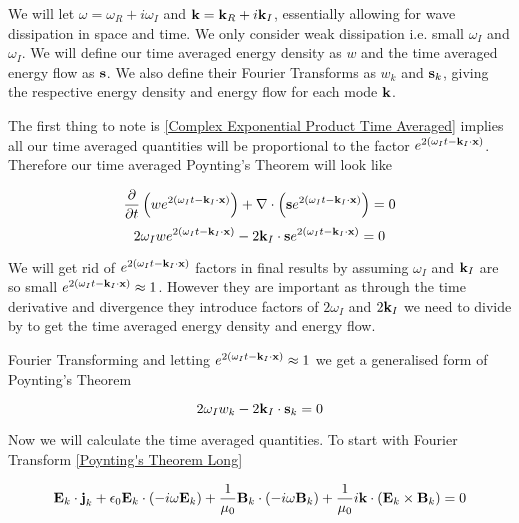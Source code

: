 We will let $\omega = \omega_R + i \omega_I$ and $\textbf{k} = \textbf{k}_R + i \textbf{k}_I$, essentially allowing for wave dissipation in space and time. We only consider weak dissipation i.e. small $\omega_I$ and $\omega_I$. We will define our time averaged energy density as $w$ and the time averaged energy flow as $\textbf{s}$. We also define their Fourier Transforms as $w_k$ and $\textbf{s}_k$, giving the respective energy density and energy flow for each mode $\textbf{k}$.

The first thing to note is \eqref{Complex Exponential Product Time Averaged} implies all our time averaged quantities will be proportional to the factor $e^{2 \left( \omega_I t - \textbf{k}_I \cdot \textbf{x} \right)}$. Therefore our time averaged Poynting's Theorem will look like

\begin{equation*}
	\frac{\partial}{\partial t} \left( w e^{2 \left( \omega_I t - \textbf{k}_I \cdot \textbf{x} \right)} \right) + \nabla \cdot \left( \textbf{s} e^{2 \left( \omega_I t - \textbf{k}_I \cdot \textbf{x} \right)} \right) = 0
\end{equation*}
\begin{equation}
	2 \omega_I w e^{2 \left( \omega_I t - \textbf{k}_I \cdot \textbf{x} \right)} - 2 \textbf{k}_I \cdot \textbf{s} e^{2 \left( \omega_I t - \textbf{k}_I \cdot \textbf{x} \right)} = 0
\end{equation}

We will get rid of $e^{2 \left( \omega_I t - \textbf{k}_I \cdot \textbf{x} \right)}$ factors in final results by assuming $\omega_I$ and $\textbf{k}_I$ are so small $e^{2 \left( \omega_I t - \textbf{k}_I \cdot \textbf{x} \right)} \approx 1$. However they are important as through the time derivative and divergence they introduce factors of $2 \omega_I$ and $2 \textbf{k}_I$ we need to divide by to get the time averaged energy density and energy flow.

Fourier Transforming and letting  $e^{2 \left( \omega_I t - \textbf{k}_I \cdot \textbf{x} \right)} \approx 1$ we get a generalised form of Poynting's Theorem

\begin{equation} \label{Poynting's Theorem Generalised}
	2 \omega_I w_k - 2 \textbf{k}_I \cdot \textbf{s}_k = 0
\end{equation}

Now we will calculate the time averaged quantities. To start with Fourier Transform \eqref{Poynting's Theorem Long}

\begin{equation} \label{Poynting's Theorem FT}
	\textbf{E}_k \cdot \textbf{j}_k + \epsilon_0 \textbf{E}_k \cdot \left( -i \omega \textbf{E}_k \right) + \frac{1}{\mu_0} \textbf{B}_k \cdot \left( -i \omega \textbf{B}_k \right) + \frac{1}{\mu_0} i\textbf{k} \cdot \left( \textbf{E}_k \times \textbf{B}_k \right) = 0
\end{equation}

